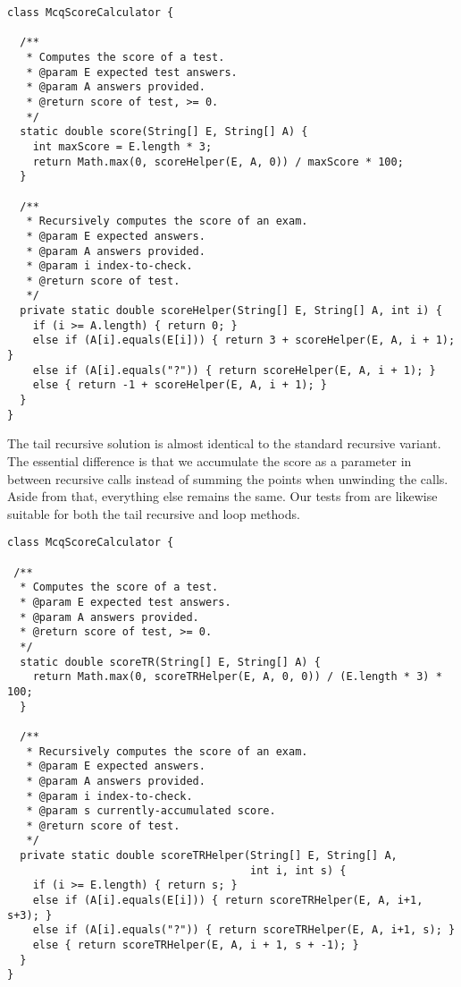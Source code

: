 \begin{lstlisting}[language=MyJava]
class McqScoreCalculator {

  /**
   * Computes the score of a test.
   * @param E expected test answers.
   * @param A answers provided.
   * @return score of test, >= 0.
   */
  static double score(String[] E, String[] A) {
    int maxScore = E.length * 3;
    return Math.max(0, scoreHelper(E, A, 0)) / maxScore * 100;
  }

  /**
   * Recursively computes the score of an exam.
   * @param E expected answers.
   * @param A answers provided.
   * @param i index-to-check.
   * @return score of test.
   */
  private static double scoreHelper(String[] E, String[] A, int i) {
    if (i >= A.length) { return 0; }
    else if (A[i].equals(E[i])) { return 3 + scoreHelper(E, A, i + 1); }
    else if (A[i].equals("?")) { return scoreHelper(E, A, i + 1); }
    else { return -1 + scoreHelper(E, A, i + 1); }
  }
}
\end{lstlisting}

The tail recursive solution is almost identical to the standard recursive variant. The essential difference is that we accumulate the score as a parameter in between recursive calls instead of summing the points when unwinding the calls. Aside from that, everything else remains the same. Our tests from  are likewise suitable for both the tail recursive and loop methods.

\enlargethispage{-5\baselineskip}
\begin{lstlisting}[language=MyJava]
class McqScoreCalculator {

 /**
  * Computes the score of a test.
  * @param E expected test answers.
  * @param A answers provided.
  * @return score of test, >= 0.
  */
  static double scoreTR(String[] E, String[] A) {
    return Math.max(0, scoreTRHelper(E, A, 0, 0)) / (E.length * 3) * 100;
  }
 
  /**
   * Recursively computes the score of an exam.
   * @param E expected answers.
   * @param A answers provided.
   * @param i index-to-check.
   * @param s currently-accumulated score.
   * @return score of test.
   */
  private static double scoreTRHelper(String[] E, String[] A, 
                                      int i, int s) {
    if (i >= E.length) { return s; }
    else if (A[i].equals(E[i])) { return scoreTRHelper(E, A, i+1, s+3); }
    else if (A[i].equals("?")) { return scoreTRHelper(E, A, i+1, s); }
    else { return scoreTRHelper(E, A, i + 1, s + -1); }
  }
}
\end{lstlisting}

